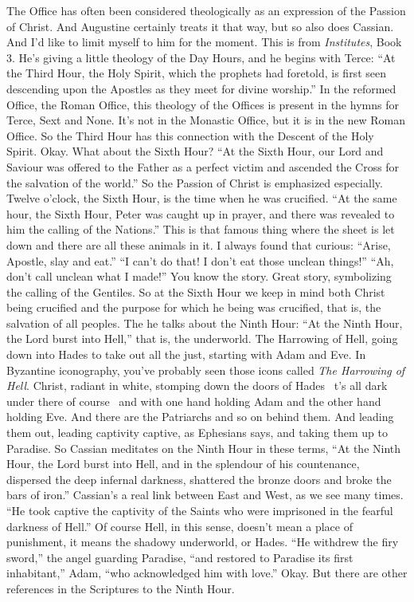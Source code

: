 The Office has often been considered theologically as an expression of the Passion of Christ. And Augustine certainly treats it that way, but so also does Cassian. And I'd like to limit myself to him for the moment. This is from \emph{Institutes}, Book 3. He's giving a little theology of the Day Hours, and he begins with Terce: ``At the Third Hour, the Holy Spirit, which the prophets had foretold, is first seen descending upon the Apostles as they meet for divine worship.'' In the reformed Office, the Roman Office, this theology of the Offices is present in the hymns for Terce, Sext and None. It's not in the Monastic Office, but it is in the new Roman Office. So the Third Hour has this connection with the Descent of the Holy Spirit. Okay. What about the Sixth Hour? ``At the Sixth Hour, our Lord and Saviour was offered to the Father as a perfect victim and ascended the Cross for the salvation of the world.'' So the Passion of Christ is emphasized especially. Twelve o'clock, the Sixth Hour, is the time when he was crucified. ``At the same hour, the Sixth Hour, Peter was caught up in prayer, and there was revealed to him the calling of the Nations.'' This is that famous thing where the sheet is let down and there are all these animals in it. I always found that curious: ``Arise, Apostle, slay and eat.'' ``I can't do that! I don't eat those unclean things!'' ``Ah, don't call unclean what I made!'' You know the story. Great story, symbolizing the calling of the Gentiles. So at the Sixth Hour we keep in mind both Christ being crucified and the purpose for which he being was crucified, that is, the salvation of all peoples. The he talks about the Ninth Hour: ``At the Ninth Hour, the Lord burst into Hell,'' that is, the underworld. The Harrowing of Hell, going down into Hades to take out all the just, starting with Adam and Eve. In Byzantine iconography, you've probably seen those icons called \emph{The Harrowing of Hell}. Christ, radiant in white, stomping down the doors of Hades \textemdash\ t's all dark under there of course \textemdash\ and with one hand holding Adam and the other hand holding Eve. And there are the Patriarchs and so on behind them. And leading them out, leading captivity captive, as Ephesians says, and taking them up to Paradise. So Cassian meditates on the Ninth Hour in these terms, ``At the Ninth Hour, the Lord burst into Hell, and in the splendour of his countenance, dispersed the deep infernal darkness, shattered the bronze doors and broke the bars of iron.'' Cassian's a real link between East and West, as we see many times. ``He took captive the captivity of the Saints who were imprisoned in the fearful darkness of Hell.'' Of course Hell, in this sense, doesn't mean a place of punishment, it means the shadowy underworld, or Hades. ``He withdrew the firy sword,'' the angel guarding Paradise, ``and restored to Paradise its first inhabitant,'' Adam, ``who acknowledged him with love.'' Okay. But there are other references in the Scriptures to the Ninth Hour.








